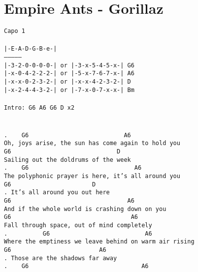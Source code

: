 \newpage
\section{Empire Ants - Gorillaz}
\label{Empire Ants - Gorillaz}
\texttt{Capo\ 1\\
\\
|-E-A-D-G-B-e-|\\
---------------\\
|-3-2-0-0-0-0-|\ or\ |-3-x-5-4-5-x-|\ G6\\
|-x-0-4-2-2-2-|\ or\ |-5-x-7-6-7-x-|\ A6\\
|-x-x-0-2-3-2-|\ or\ |-x-x-4-2-3-2-|\ D \\
|-x-2-4-4-3-2-|\ or\ |-7-x-0-7-x-x-|\ Bm\\
\\
Intro:\ G6\ A6\ G6\ D\ x2\\
\\
\\
. \ \ \ G6\ \ \ \ \ \ \ \ \ \ \ \ \ \ \ \ \ \ \ \ \ \ \ \ \ \ \ A6\\
Oh,\ joys\ arise,\ the\ sun\ has\ come\ again\ to\ hold\ you\\
G6\ \ \ \ \ \ \ \ \ \ \ \ \ \ \ \ \ \ \ \ \ \ \ \ \ \ \ \ \ \ D\\
Sailing\ out\ the\ doldrums\ of\ the\ week\\
. \ \ \ G6\ \ \ \ \ \ \ \ \ \ \ \ \ \ \ \ \ \ \ \ \ \ \ \ \ \ \ \ \ \ A6\\
The\ polyphonic\ prayer\ is\ here,\ it's\ all\ around\ you\\
G6\ \ \ \ \ \ \ \ \ \ \ \ \ \ \ \ \ \ \ \ \ \ \ D\\
. It's\ all\ around\ you\ out\ here\\
G6\ \ \ \ \ \ \ \ \ \ \ \ \ \ \ \ \ \ \ \ \ \ \ \ \ \ \ \ \ \ \ \ \ A6\\
And\ if\ the\ whole\ world\ is\ crashing\ down\ on\ you\\
G6\ \ \ \ \ \ \ \ \ \ \ \ \ \ \ \ \ \ \ \ \ \ \ \ \ \ \ \ \ \ \ \ \ \ A6\\
Fall\ through\ space,\ out\ of\ mind\ completely\\
. \ \ \ \ \ \ \ \ \ G6\ \ \ \ \ \ \ \ \ \ \ \ \ \ \ \ \ \ \ \ \ \ \ \ \ \ \ A6\\
Where\ the\ emptiness\ we\ leave\ behind\ on\ warm\ air\ rising\\
G6\ \ \ \ \ \ \ \ \ \ \ \ \ \ \ \ \ \ \ \ \ \ \ \ \ A6\\
. Those\ are\ the\ shadows\ far\ away\\
. \ \ \ G6\ \ \ \ \ \ \ \ \ \ \ \ \ \ \ \ \ \ \ \ \ \ \ \ \ \ \ \ \ \ \ \ A6\\
}
